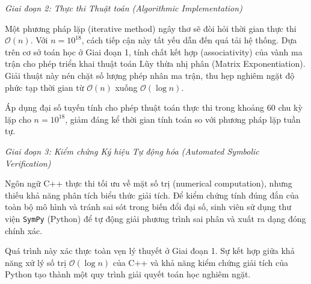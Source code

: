 \documentclass{article}
\begin{document}
\vspace{0.5em}\noindent\emph{Giai đoạn 2: Thực thi Thuật toán (Algorithmic Implementation)}

Một phương pháp lặp (iterative method) ngây thơ sẽ đòi hỏi thời gian thực thi $\mathcal{O}(n)$. Với $n = 10^{18}$, cách tiếp cận này tất yếu dẫn đến quá tải hệ thống. Dựa trên cơ sở toán học ở Giai đoạn 1, tính chất kết hợp (associativity) của vành ma trận cho phép triển khai thuật toán Lũy thừa nhị phân (Matrix Exponentiation). Giải thuật này nén chặt số lượng phép nhân ma trận, thu hẹp nghiêm ngặt độ phức tạp thời gian từ $\mathcal{O}(n)$ xuống $\mathcal{O}(\log n)$.

Áp dụng đại số tuyến tính cho phép thuật toán thực thi trong khoảng 60 chu kỳ lặp cho $n = 10^{18}$, giảm đáng kể thời gian tính toán so với phương pháp lặp tuần tự.

\vspace{0.5em}\noindent\emph{Giai đoạn 3: Kiểm chứng Ký hiệu Tự động hóa (Automated Symbolic Verification)}

Ngôn ngữ C++ thực thi tối ưu về mặt số trị (numerical computation), nhưng thiếu khả năng phân tích biểu thức giải tích. Để kiểm chứng tính đúng đắn của toàn bộ mô hình và tránh sai sót trong biến đổi đại số, sinh viên sử dụng thư viện \texttt{\textsf{SymPy}} (Python) để tự động giải phương trình sai phân và xuất ra dạng đóng chính xác.

Quá trình này xác thực toàn vẹn lý thuyết ở Giai đoạn 1. Sự kết hợp giữa khả năng xử lý số trị $\mathcal{O}(\log n)$ của C++ và khả năng kiểm chứng giải tích của Python tạo thành một quy trình giải quyết toán học nghiêm ngặt.
\end{document}
